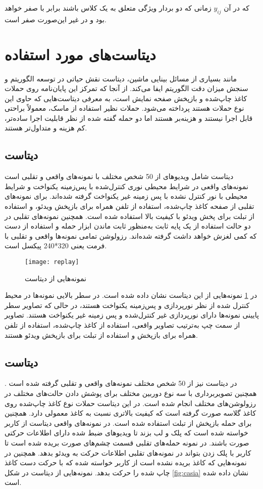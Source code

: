 که در آن 
$y_{ij}$
  زمانی که دو بردار ویژگی متعلق به یک کلاس باشند برابر با صفر خواهد بود و در غیر این‌صورت صفر است.
  \section{دیتاست‌های مورد استفاده}
  مانند بسیاری از مسائل بینایی ماشین، دیتاست نقش حیاتی در توسعه الگوریتم و سنجش میزان دقت الگوریتم ایفا می‌کند. از آنجا که تمرکز این پایان‌نامه روی حملات کاغذ چاپ‌شده و بازپخش صفحه نمایش است، به معرفی دیتاست‌هایی که حاوی این نوع حملات هستند پرداخته می‌شود. حملات نظیر استفاده از ماسک، معمولاً براحتی قابل اجرا نیستند و هزینه‌بر هستند اما دو حمله گفته شده از نظر قابلیت اجرا ساده‌تر، کم هزینه و متداول‌تر هستند. 
\subsection{دیتاست }
دیتاست  شامل ویدیوهای از 50 شخص مختلف با نمونه‌های واقعی و تقلبی است
\cite{chingovska2012effectiveness}
 نمونه‌های واقعی در شرایط محیطی نوری کنترل‌شده با پس‌زمینه یکنواخت و شرایط محیطی با نور کنترل نشده با پس زمینه غیر یکنواخت گرفته شده‌اند. برای نمونه‌های تقلبی از صفحه کاغذ چاپ‌شده، استفاده از تلفن همراه برای بازپخش ویدئو، و استفاده از تبلت  برای پخش ویدئو با کیفیت بالا استفاده شده است. همچنین نمونه‌های تقلبی در دو حالت استفاده از یک پایه ثابت به‌منظور ثابت ماندن ابزار حمله و استفاده از دست که کمی لغزش خواهد داشت گرفته شده‌اند. رزولوشن تمامی نمونه‌ها واقعی و تقلبی با فرمت  یعنی 320*240 پیکسل است.
\begin{figure}[h]
 	\centerline{\texttt{[image: replay]}}
 	\caption{نمونه‌هایی از دیتاست  \cite{chingovska2012effectiveness} }
 	\label{fig:replay}
\end{figure}
در
\ref{fig:replay}
نمونه‌هایی از این دیتاست نشان داده شده است. در سطر بالایی نمونه‌ها در محیط کنترل شده از نظر نورپردازی و پس‌زمینه یکنواخت هستند، در حالی که تصاویر سطر پایینی نمونه‌ها دارای نورپردازی غیر کنترل‌شده و پس زمینه غیر یکنواخت هستند. تصاویر از سمت چپ به‌ترتیب تصاویر واقعی، استفاده از کاغذ چاپ‌شده، استفاده از تلفن همراه برای بازپخش و استفاده از تبلت برای بازپخش ویدئو هستند.
\subsection{دیتاست }
در دیتاست  نیز از 50 شخص مختلف نمونه‌های واقعی و تقلبی گرفته شده است 
\cite{zhang2012face}
. همچنین تصویربرداری با سه نوع دوربین مختلف برای پوشش دادن حالت‌های مختلف در رزولوشن‌های مختلف انجام شده است. در این دیتاست حملات نوع کاغذ چاپ‌شده روی کاغذ گلاسه صورت گرفته است که کیفیت بالاتری نسبت به کاغذ معمولی دارد. همچنین برای حمله بازپخش از تبلت استفاده شده است. در نمونه‌های واقعی دیتاست از کاربر خواسته شده است که پلک و لب بزند تا ویدیوهای ضبط شده دارای اطلاعات حرکتی صورت باشند. در نمونه حمله‌های تقلبی قسمت چشم‌های صورت بریده شده است تا کاربر با پلک زدن بتواند در نمونه‌های تقلبی اطلاعات حرکت به ویدئو بدهد. همچنین در نمونه‌هایی که کاغذ بریده نشده است از کاربر خواسته شده که با حرکت دست کاغذ چاپ شده را حرکت بدهد. نمونه‌هایی از دیتاست  در شکل 
\ref{fig:casia}
نشان داده شده است.

